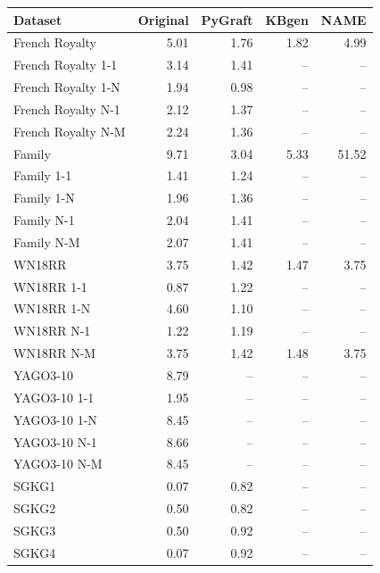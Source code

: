 \begin{tabular}{lrrrr}
\toprule
Dataset & Original & PyGraft & KBgen & NAME \\
\midrule
French Royalty & 5.01 & 1.76 & 1.82 & 4.99 \\
French Royalty 1-1 & 3.14 & 1.41 & – & – \\
French Royalty 1-N & 1.94 & 0.98 & – & – \\
French Royalty N-1 & 2.12 & 1.37 & – & – \\
French Royalty N-M & 2.24 & 1.36 & – & – \\
\midrule
Family & 9.71 & 3.04 & 5.33 & 51.52 \\
Family 1-1 & 1.41 & 1.24 & – & – \\
Family 1-N & 1.96 & 1.36 & – & – \\
Family N-1 & 2.04 & 1.41 & – & – \\
Family N-M & 2.07 & 1.41 & – & – \\
\midrule
WN18RR & 3.75 & 1.42 & 1.47 & 3.75 \\
WN18RR 1-1 & 0.87 & 1.22 & – & – \\
WN18RR 1-N & 4.60 & 1.10 & – & – \\
WN18RR N-1 & 1.22 & 1.19 & – & – \\
WN18RR N-M & 3.75 & 1.42 & 1.48 & 3.75 \\
\midrule
YAGO3-10 & 8.79 & – & – & – \\
YAGO3-10 1-1 & 1.95 & – & – & – \\
YAGO3-10 1-N & 8.45 & – & – & – \\
YAGO3-10 N-1 & 8.66 & – & – & – \\
YAGO3-10 N-M & 8.45 & – & – & – \\
\midrule
SGKG1 & 0.07 & 0.82 & – & – \\
SGKG2 & 0.50 & 0.82 & – & – \\
SGKG3 & 0.50 & 0.92 & – & – \\
SGKG4 & 0.07 & 0.92 & – & – \\
\bottomrule
\end{tabular}

